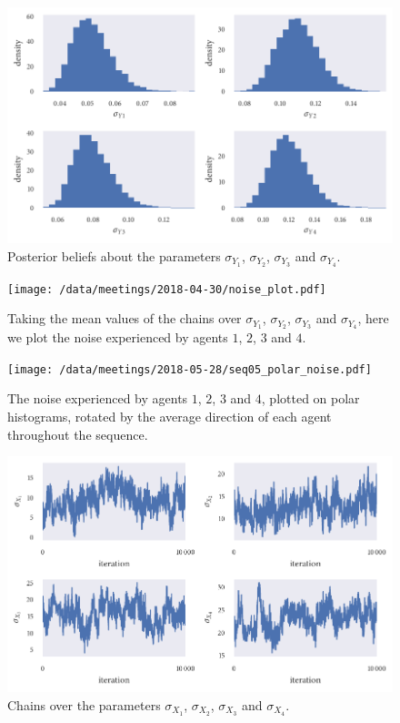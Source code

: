 \begin{figure}[!tbp]
	\includegraphics{seq05_hist_sigmay.pdf}
	\caption{Posterior beliefs about the parameters $\sigma_{Y_1}$, $\sigma_{Y_2}$, $\sigma_{Y_3}$ and $\sigma_{Y_4}$.}
	\label{fig:hist_sigmay}
\end{figure}
\begin{figure}[!tbp]
	\texttt{[image: /data/meetings/2018-04-30/noise\_plot.pdf]}
	\caption{Taking the mean values of the chains over $\sigma_{Y_1}$, $\sigma_{Y_2}$, $\sigma_{Y_3}$ and $\sigma_{Y_4}$, here we plot the noise experienced by agents $1$, $2$, $3$ and $4$.}
	\label{fig:noise_pdf}
\end{figure}
\begin{figure}[!tbp]
	\texttt{[image: /data/meetings/2018-05-28/seq05\_polar\_noise.pdf]}
	\caption{The noise experienced by agents $1$, $2$, $3$ and $4$, plotted on polar histograms, rotated by the average direction of each agent throughout the sequence.}
	\label{fig:noise_polar}
\end{figure}
\begin{figure}[!tbp]
	\includegraphics{seq05_trace_sigmax.pdf}
	\caption{Chains over the parameters $\sigma_{X_1}$, $\sigma_{X_2}$, $\sigma_{X_3}$ and $\sigma_{X_4}$.}
	\label{fig:trace_sigmax}
\end{figure}
